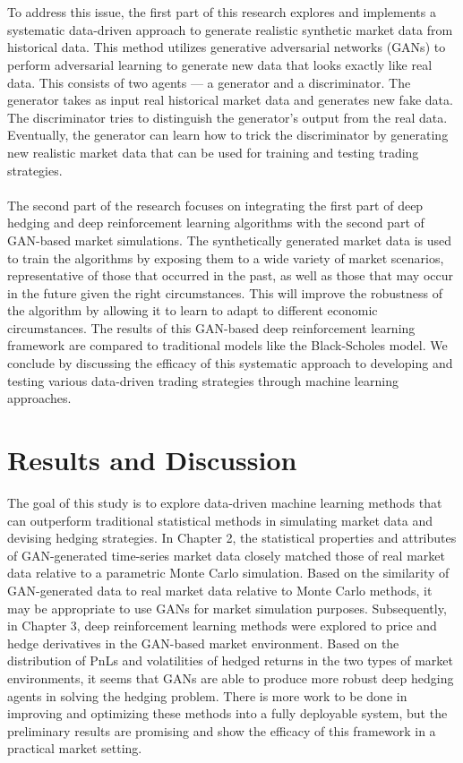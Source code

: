 \\ \\
To address this issue, the first part of this research explores and implements a systematic data-driven approach to generate realistic synthetic market data from historical data. This method utilizes generative adversarial networks (GANs) to perform adversarial learning to generate new data that looks exactly like real data. This consists of two agents — a generator and a discriminator. The generator takes as input real historical market data and generates new fake data. The discriminator tries to distinguish the generator's output from the real data. Eventually, the generator can learn how to trick the discriminator by generating new realistic market data that can be used for training and testing trading strategies.
\\ \\
The second part of the research focuses on integrating the first part of deep hedging and deep reinforcement learning algorithms with the second part of GAN-based market simulations. The synthetically generated market data is used to train the algorithms by exposing them to a wide variety of market scenarios, representative of those that occurred in the past, as well as those that may occur in the future given the right circumstances. This will improve the robustness of the algorithm by allowing it to learn to adapt to different economic circumstances. The results of this GAN-based deep reinforcement learning framework are compared to traditional models like the Black-Scholes model. We conclude by discussing the efficacy of this systematic approach to developing and testing various data-driven trading strategies through machine learning approaches.

\section{Results and Discussion}
The goal of this study is to explore data-driven machine learning methods that can outperform traditional statistical methods in simulating market data and devising hedging strategies. In Chapter 2, the statistical properties and attributes of GAN-generated time-series market data closely matched those of real market data relative to a parametric Monte Carlo simulation. Based on the similarity of GAN-generated data to real market data relative to Monte Carlo methods, it may be appropriate to use GANs for market simulation purposes. Subsequently, in Chapter 3, deep reinforcement learning methods were explored to price and hedge derivatives in the GAN-based market environment. Based on the distribution of PnLs and volatilities of hedged returns in the two types of market environments, it seems that GANs are able to produce more robust deep hedging agents in solving the hedging problem. There is more work to be done in improving and optimizing these methods into a fully deployable system, but the preliminary results are promising and show the efficacy of this framework in a practical market setting.

